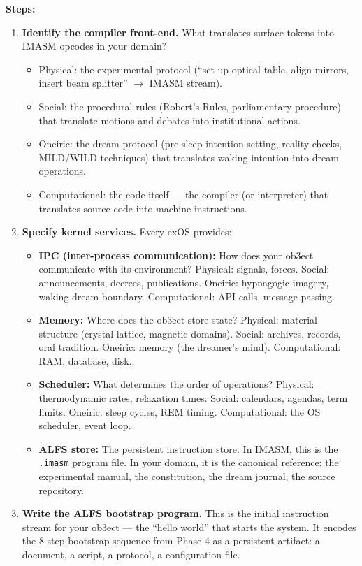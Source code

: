 \documentclass[12pt,a4paper]{article}
\begin{document}
{\bf Steps:}

\begin{enumerate}[label=\textbf{5.\arabic*.}, leftmargin=2em]
\item \textbf{Identify the compiler front-end.} What translates surface tokens into
    IMASM opcodes in your domain?
    \begin{itemize}
    \item Physical: the experimental protocol (``set up optical table, align mirrors,
        insert beam splitter'' $\to$ IMASM stream).
    \item Social: the procedural rules (Robert's Rules, parliamentary procedure) that
        translate motions and debates into institutional actions.
    \item Oneiric: the dream protocol (pre-sleep intention setting, reality checks,
        MILD/WILD techniques) that translates waking intention into dream operations.
    \item Computational: the code itself — the compiler (or interpreter) that
        translates source code into machine instructions.
    \end{itemize}

\item \textbf{Specify kernel services.} Every exOS provides:
    \begin{itemize}
    \item {\bf IPC (inter-process communication):} How does your ob3ect communicate
        with its environment? Physical: signals, forces. Social: announcements,
        decrees, publications. Oneiric: hypnagogic imagery, waking-dream boundary.
        Computational: API calls, message passing.
    \item {\bf Memory:} Where does the ob3ect store state? Physical: material structure
        (crystal lattice, magnetic domains). Social: archives, records, oral tradition.
        Oneiric: memory (the dreamer's mind). Computational: RAM, database, disk.
    \item {\bf Scheduler:} What determines the order of operations? Physical:
        thermodynamic rates, relaxation times. Social: calendars, agendas, term
        limits. Oneiric: sleep cycles, REM timing. Computational: the OS scheduler,
        event loop.
    \item {\bf ALFS store:} The persistent instruction store. In IMASM, this is the
        \texttt{.imasm} program file. In your domain, it is the canonical reference:
        the experimental manual, the constitution, the dream journal, the source
        repository.
    \end{itemize}

\item \textbf{Write the ALFS bootstrap program.} This is the initial instruction
    stream for your ob3ect — the ``hello world'' that starts the system. It encodes
    the 8-step bootstrap sequence from Phase 4 as a persistent artifact: a document,
    a script, a protocol, a configuration file.
\end{enumerate}
\end{document}
